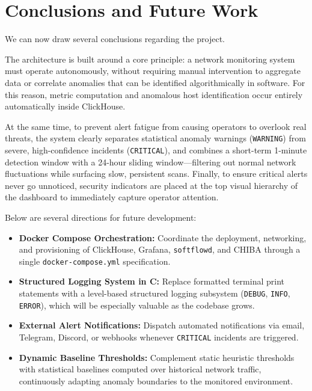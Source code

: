 \documentclass[11pt,a4paper]{article}
\begin{document}
\section{Conclusions and Future Work}
We can now draw several conclusions regarding the project.

The architecture is built around a core principle: a network monitoring system must operate autonomously, without requiring manual intervention to aggregate data or correlate anomalies that can be identified algorithmically in software. For this reason, metric computation and anomalous host identification occur entirely automatically inside ClickHouse.

At the same time, to prevent alert fatigue from causing operators to overlook real threats, the system clearly separates statistical anomaly warnings (\texttt{WARNING}) from severe, high-confidence incidents (\texttt{CRITICAL}), and combines a short-term 1-minute detection window with a 24-hour sliding window---filtering out normal network fluctuations while surfacing slow, persistent scans. Finally, to ensure critical alerts never go unnoticed, security indicators are placed at the top visual hierarchy of the dashboard to immediately capture operator attention.

Below are several directions for future development:
\begin{itemize}
    \item \textbf{Docker Compose Orchestration:} Coordinate the deployment, networking, and provisioning of ClickHouse, Grafana, \texttt{softflowd}, and CHIBA through a single \texttt{docker-compose.yml} specification.
    \item \textbf{Structured Logging System in C:} Replace formatted terminal print statements with a level-based structured logging subsystem (\texttt{DEBUG}, \texttt{INFO}, \texttt{ERROR}), which will be especially valuable as the codebase grows.
    \item \textbf{External Alert Notifications:} Dispatch automated notifications via email, Telegram, Discord, or webhooks whenever \texttt{CRITICAL} incidents are triggered.
    \item \textbf{Dynamic Baseline Thresholds:} Complement static heuristic thresholds with statistical baselines computed over historical network traffic, continuously adapting anomaly boundaries to the monitored environment.
\end{itemize}
\end{document}

